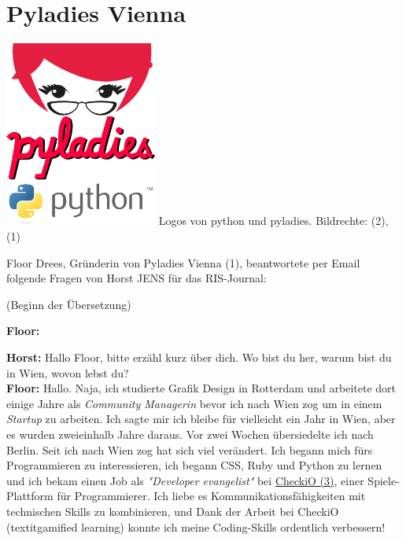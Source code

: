 \section*{Pyladies Vienna}

\begin{center}
\includegraphics[width=5cm]{floorlogo.png}
\footnotesize{Logos von python und pyladies. Bildrechte: (2), (1)}
\end{center}

Floor Drees, Gründerin von Pyladies Vienna (1), beantwortete per Email folgende Fragen von Horst JENS für das RIS-Journal:

(Beginn der Übersetzung)

\textbf{Floor:}

\textbf{Horst:} Hallo Floor, bitte erzähl kurz über dich. Wo bist du her, warum bist du in Wien, wovon lebst du? \\
\textbf{Floor:} Hallo. Naja, ich studierte Grafik Design in Rotterdam und arbeitete dort einige Jahre als \textit{Community Managerin} bevor ich nach Wien zog um in einem \textit{Startup} zu arbeiten.  Ich sagte mir ich bleibe für vielleicht ein Jahr in Wien, aber es wurden zweieinhalb Jahre daraus. Vor zwei Wochen übersiedelte ich nach Berlin. Seit ich nach Wien zog hat sich viel verändert. Ich begann mich fürs Programmieren zu interessieren, ich begann CSS, Ruby und Python zu lernen und ich bekam einen Job als \textit{"Developer evangelist"} bei \href{http://www.checkio.org/}{CheckiO (3)}, einer Spiele-Plattform für Programmierer. Ich liebe es Kommunikationsfähigkeiten mit technischen Skills zu kombinieren, und Dank der Arbeit bei CheckiO (textit{gamified learning}) konnte ich meine Coding-Skills ordentlich verbessern! \\

